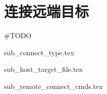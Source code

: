 \section{连接远端目标}

\#TODO

{sub_connect_type.tex}

{sub_host_target_file.tex}

{sub_remote_connect_cmds.tex}
